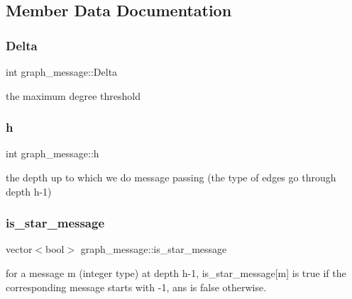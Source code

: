 \subsection{Member Data Documentation}
\mbox{\label{classgraph__message_a45dfd061b7bc73572e5132fbf66efd55}} 
\subsubsection{\texorpdfstring{Delta}{Delta}}
{\footnotesize\ttfamily int graph\+\_\+message\+::\+Delta\hspace{0.3cm}{\ttfamily [private]}}



the maximum degree threshold 

\mbox{\label{classgraph__message_a934d63ed7275c211e13c6fb68824ed46}} 
\subsubsection{\texorpdfstring{h}{h}}
{\footnotesize\ttfamily int graph\+\_\+message\+::h\hspace{0.3cm}{\ttfamily [private]}}



the depth up to which we do message passing (the type of edges go through depth h-\/1) 

\mbox{\label{classgraph__message_a55ff5531a0043106369e84a7bc45e22d}} 
\subsubsection{\texorpdfstring{is\+\_\+star\+\_\+message}{is\_star\_message}}
{\footnotesize\ttfamily vector$<$bool$>$ graph\+\_\+message\+::is\+\_\+star\+\_\+message}



for a message m (integer type) at depth h-\/1, is\+\_\+star\+\_\+message\mbox{[}m\mbox{]} is true if the corresponding message starts with -\/1, ans is false otherwise. 

